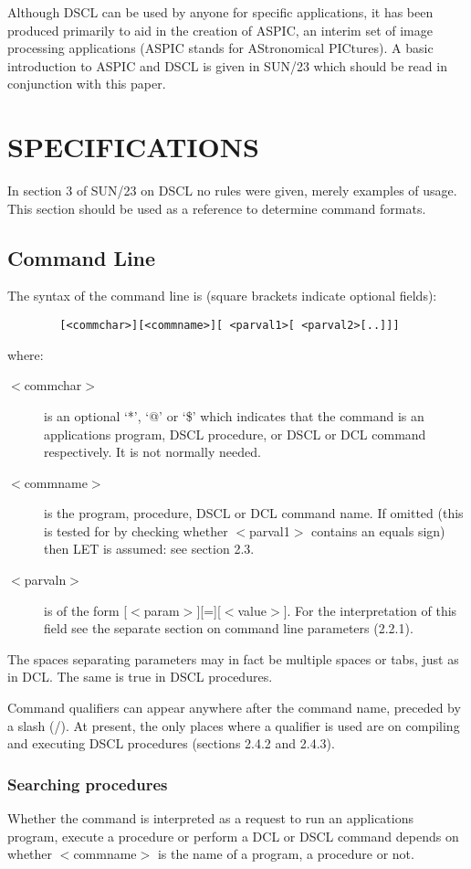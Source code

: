 Although DSCL can be used by anyone for specific applications, it has been
produced primarily to aid in the creation of ASPIC, an interim set of image
processing applications (ASPIC stands for AStronomical PICtures).
A basic introduction to ASPIC and DSCL is given in SUN/23 which should be
read in conjunction with this paper.
\section {SPECIFICATIONS}
In section 3 of SUN/23 on DSCL no rules were given, merely examples of usage.
This section should be used as a reference to determine command formats.
\subsection {Command Line}
The syntax of the command line is (square brackets indicate optional fields):
\begin{verbatim}
        [<commchar>][<commname>][ <parval1>[ <parval2>[..]]]
\end{verbatim}
where:
\begin{description}
\item [$<$commchar$>$] is an optional `*', `@' or `\$' which indicates that the
command is an applications program, DSCL procedure, or DSCL or DCL command
respectively.
It is not normally needed.
\item [$<$commname$>$] is the program, procedure, DSCL or DCL command name.
If omitted (this is tested for by checking whether $<$parval1$>$ contains an equals
sign) then LET is assumed: see section 2.3.
\item [$<$parvaln$>$] is of the form [$<$param$>$][=][$<$value$>$].
For the interpretation of this field see the separate section on command line
parameters (2.2.1).
\end{description}
The spaces separating parameters may in fact be multiple spaces or tabs, just as
in DCL.
The same is true in DSCL procedures.

Command qualifiers can appear anywhere after the command name, preceded by a
slash (/).
At present, the only places where a qualifier is used are on compiling and
executing DSCL procedures (sections 2.4.2 and 2.4.3).
\subsubsection {Searching procedures}
Whether the command is interpreted as a request to run an applications program,
execute a procedure or perform a DCL or DSCL command depends on whether
$<$commname$>$ is the name of a program, a procedure or not.

